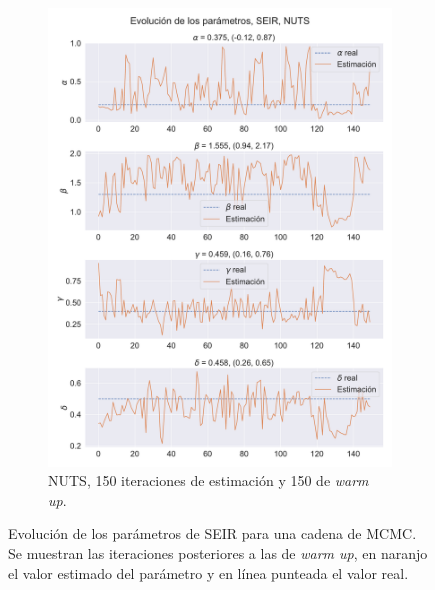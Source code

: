 \begin{figure}[h]
\begin{subfigure}[b]{0.49\linewidth}
        \includegraphics[width=\linewidth]{img/content/chapter4/NUTS_seir_params_trace.pdf}
        \caption{NUTS, 150 iteraciones de estimación y 150 de \textit{warm up}.}
        \label{fig:NUTS_seir_params_trace}
    \end{subfigure}
    \caption{Evolución de los parámetros de SEIR para una cadena de MCMC. Se muestran las iteraciones posteriores a las de \textit{warm up}, en naranjo el valor estimado del parámetro y en línea punteada el valor real.}
    \label{fig:MCMC_seir_params_trace}
\end{figure}

